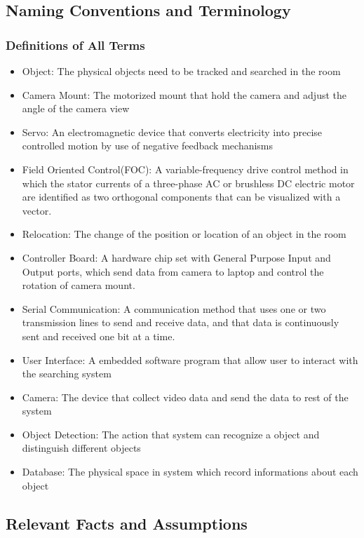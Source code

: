 \documentclass[12pt]{article}
\begin{document}
\subsection{Naming Conventions and Terminology}
	\subsubsection{Definitions of All Terms}
		\begin{itemize}
			\item Object: The physical objects need to be tracked and searched in the room
			\item Camera Mount: The motorized mount that hold the camera and adjust the angle of the camera view
			\item Servo: An electromagnetic device that converts electricity into precise controlled motion by use of negative feedback mechanisms
			\item Field Oriented Control(FOC): A variable-frequency drive control method in which the stator currents of a three-phase AC or brushless DC electric motor are identified as two orthogonal components that can be visualized with a vector.
			\item Relocation: The change of the position or location of an object in the room
			\item Controller Board: A hardware chip set with General Purpose Input and Output ports, which send data from camera to laptop and control the rotation of camera mount.
			\item Serial Communication: A communication method that uses one or two transmission lines to send and receive data, and that data is continuously sent and received one bit at a time.
			\item User Interface: A embedded software program that allow user to interact with the searching system
			\item Camera: The device that collect video data and send the data to rest of the system
			\item Object Detection: The action that system can recognize a object and distinguish different objects
			\item Database: The physical space in system which record informations about each object

			
		\end{itemize}



\subsection{Relevant Facts and Assumptions}
\end{document}
